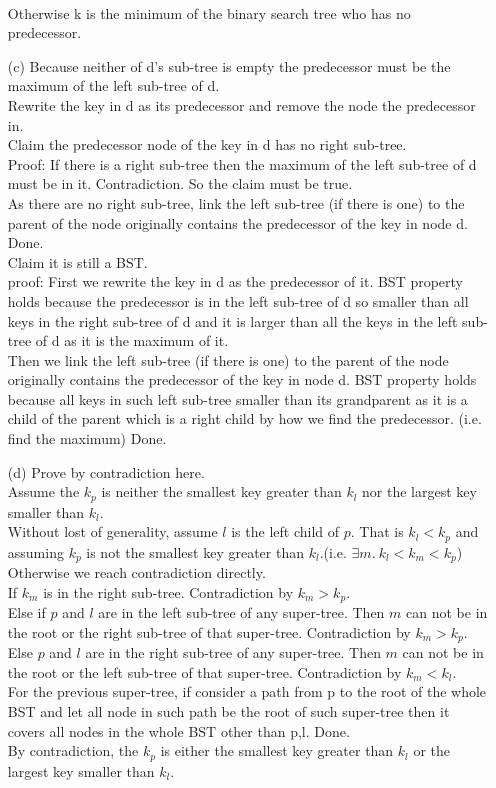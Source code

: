 \documentclass[10pt,twoside,a4paper]{article}
\begin{document}
\begin{itemize}
\\Otherwise k is the minimum of the binary search tree who has no predecessor.
\item[(c)]
Because neither of d's sub-tree is empty the predecessor must be the maximum of the left sub-tree of d.
\\Rewrite the key in d as its predecessor and remove the node the predecessor in.
\\Claim the predecessor node of the key in d has no right sub-tree.
\\Proof: If there is a right sub-tree then the maximum of the left sub-tree of d must be in it. Contradiction. So the claim must be true.
\\As there are no right sub-tree, link the left sub-tree (if there is one) to the parent of the node originally contains the predecessor of the key in node d. Done.
\\Claim it is still a BST.
\\proof: First we rewrite the key in d as the predecessor of it. BST property holds because the predecessor is in the left sub-tree of d so smaller than all keys in the right sub-tree of d and it is larger than all the keys in the left sub-tree of d as it is the maximum of it.
\\Then we link the left sub-tree (if there is one) to the parent of the node originally contains the predecessor of the key in node d. BST property holds because all keys in such left sub-tree smaller than its grandparent as it is a child of the parent which is a right child by how we find the predecessor. (i.e. find the maximum) Done.
\item[(d)]
Prove by contradiction here.
\\Assume the $k_p$ is neither the smallest key greater than $k_l$ nor the largest key smaller than $k_l$.
\\Without lost of generality, assume $l$ is the left child of $p$. That is $k_l<k_p$ and assuming $k_p$ is not the smallest key greater than $k_l$.(i.e. $\exists m.\ k_l<k_m<k_p$) Otherwise we reach contradiction directly.
\\If $k_m$ is in the right sub-tree. Contradiction by $k_m>k_p$.
\\Else if $p$ and $l$ are in the left sub-tree of any super-tree.  Then $m$ can not be in the root or the right sub-tree of that super-tree. Contradiction by $k_m>k_p$.
\\Else $p$ and $l$ are in the right sub-tree of any super-tree. Then $m$ can not be in the root or the left sub-tree of that super-tree. Contradiction by $k_m<k_l$.
\\For the previous super-tree, if consider a path from p to the root of the whole BST and let all node in such path be the root of such super-tree then it covers all nodes in the whole BST other than p,l. Done.
\\By contradiction, the $k_p$ is either the smallest key greater than $k_l$ or the largest key smaller than $k_l$.
\end{itemize}
\end{document}
